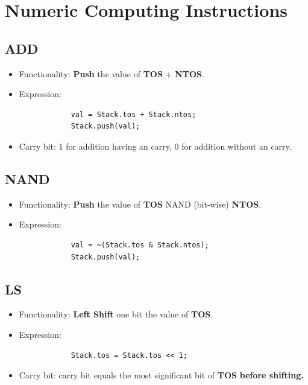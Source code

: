\documentclass[11pt]{report}
\begin{document}
    \section{Numeric Computing Instructions}
    \subsection{ADD}
    \label{subsection:add}
    \begin{itemize}
        \item Functionality: \textbf{Push} the value of \textbf{TOS} + \textbf{NTOS}.
        \item Expression:
        \begin{verbatim}
            val = Stack.tos + Stack.ntos;
            Stack.push(val);
        \end{verbatim}
        \item Carry bit: 1 for addition having an carry, 0 for addition without an carry.
    \end{itemize}

    \subsection{NAND}
    \begin{itemize}
        \item Functionality: \textbf{Push} the value of \textbf{TOS} NAND (bit-wise) \textbf{NTOS}.
        \item Expression:
        \begin{verbatim}
            val = ~(Stack.tos & Stack.ntos);
            Stack.push(val);
        \end{verbatim}
    \end{itemize}

    \subsection{LS}
    \label{subsection:ls}
    \begin{itemize}
        \item Functionality: \textbf{Left Shift} one bit the value of \textbf{TOS}.
        \item Expression:
        \begin{verbatim}
            Stack.tos = Stack.tos << 1;
        \end{verbatim}
        \item Carry bit: carry bit equals the most significant bit of \textbf{TOS} \textbf{before shifting.} 
    \end{itemize}
\end{document}
